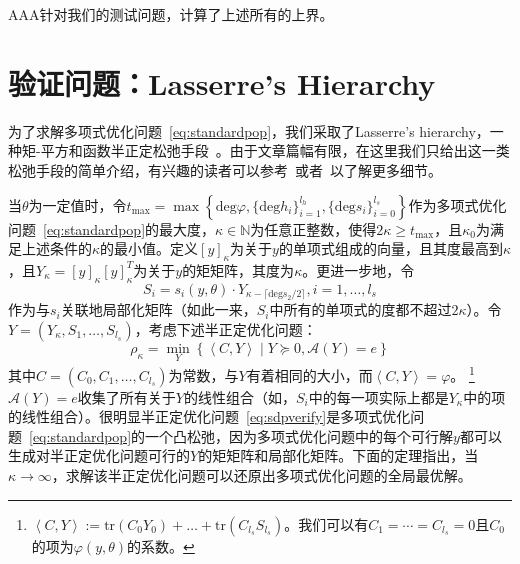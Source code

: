 {\color{red} AAA}针对我们的测试问题，计算了上述所有的上界。

\section{验证问题：Lasserre's Hierarchy}
\label{sec:sdpverify}

为了求解多项式优化问题~\eqref{eq:standardpop}，我们采取了Lasserre's hierarchy，一种矩-平方和函数半正定松弛手段~\cite{lasserre01siopt-global}。由于文章篇幅有限，在这里我们只给出这一类松弛手段的简单介绍，有兴趣的读者可以参考~\cite{lasserre01siopt-global}或者~\cite{yang22pami-certifiably}以了解更多细节。

当$\theta$为一定值时，令$t_{\max} = \max\left\{ \text{deg}\varphi, \{\text{deg} h_i\}_{i=1}^{l_h}, \{\text{deg}s_i\}_{i=0}^{l_s} \right\}$作为多项式优化问题~\eqref{eq:standardpop}的最大度，$\kappa \in \mathbb{N}$为任意正整数，使得$2 \kappa \ge t_{\max}$，且$\kappa_0$为满足上述条件的$\kappa$的最小值。定义$[y]_\kappa$为关于$y$的单项式组成的向量，且其度最高到$\kappa$，且$Y_\kappa = [y]_\kappa [y]_\kappa^T$为关于$y$的矩矩阵，其度为$\kappa$。更进一步地，令
\begin{equation}
    S_i = s_i(y, \theta) \cdot Y_{\kappa - \lceil \text{deg}s_2/2 \rceil}, i = 1, \dots, l_s
\end{equation}
作为与$s_i$关联地局部化矩阵（如此一来，$S_i$中所有的单项式的度都不超过$2\kappa$）。令$Y = \left( Y_\kappa, S_1, \dots, S_{l_s} \right)$，考虑下述半正定优化问题：
\begin{equation}\label{eq:sdpverify}
    \rho_\kappa = \min_{Y}\left\{ \left< C, Y \right> \mid Y \succeq 0, \mathcal{A}(Y) = e \right\}
\end{equation}
其中$C = (C_0, C_1, \dots, C_{l_s})$为常数，与$Y$有着相同的大小，而$\left< C, Y \right> = \varphi$。
\footnote{$\left< C, Y \right> := \text{tr}(C_0 Y_0) + \dots + \text{tr}(C_{l_s} S_{l_s})$。我们可以有$C_1 = \cdots = C_{l_s} = 0$且$C_0$的项为$\varphi(y, \theta)$的系数。}
$\mathcal{A}(Y) = e$收集了所有关于$Y$的线性组合（如，$S_i$中的每一项实际上都是$Y_\kappa$中的项的线性组合）。很明显半正定优化问题~\eqref{eq:sdpverify}是多项式优化问题~\eqref{eq:standardpop}的一个凸松弛，因为多项式优化问题中的每个可行解$y$都可以生成对半正定优化问题可行的$Y$的矩矩阵和局部化矩阵。下面的定理指出，当$\kappa \rightarrow \infty$，求解该半正定优化问题可以还原出多项式优化问题的全局最优解。

